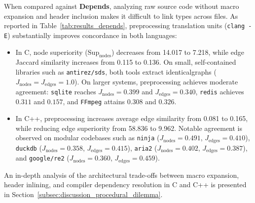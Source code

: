 When compared against \textbf{Depends}, analyzing raw source code
without mac\-ro
expansion and header inclusion makes it difficult to link types across files.
As reported in Table~\ref{tab:results_depends}, preprocessing translation units
(\texttt{clang -E}) substantially improves concordance in both languages:
\begin{itemize}
  \item In C, node superiority ($\text{Sup}_{\text{nodes}}$)
    decreases from 14.017
    to 7.218, while edge Jaccard similarity increases from 0.115 to
    0.136. On small,
    self-contained libraries such as \texttt{antirez/sds}, both tools extract
    identical\linebreak graphs ($J_{\text{nodes}} = J_{\text{edges}}
    = 1.0$). On larger
    systems, preprocessing achieves moderate agreement: \texttt{sqlite} reaches
    $J_{\text{nodes}} = 0.399$ and $J_{\text{edges}} = 0.340$, \texttt{redis}
    achieves $0.311$ and $0.157$, and \texttt{FFmpeg} attains $0.308$
    and $0.326$.
  \item In C++, preprocessing increases average edge similarity from 0.081 to
    0.165, while reducing edge superiority from 58.836 to 9.962.
    Notable agreement
    is observed on modular codebases such as \texttt{ninja}
    ($J_{\text{nodes}} = 0.491$,
    $J_{\text{edges}} = 0.410$), \texttt{duckdb} ($J_{\text{nodes}} = 0.358$,
    $J_{\text{edges}} = 0.415$), \texttt{aria2} ($J_{\text{nodes}} = 0.402$,
    $J_{\text{edges}} = 0.387$), and \texttt{google/re2}
    ($J_{\text{nodes}} = 0.360$,
    $J_{\text{edges}} = 0.459$).
\end{itemize}
An in-depth analysis of the architectural trade-offs between macro
expansion, header inlining, and compiler dependency resolution in
C and C++ is presented in
Section~\ref{subsec:discussion_procedural_dilemma}.

